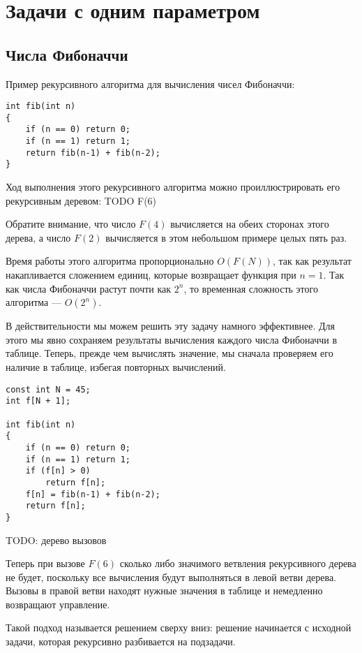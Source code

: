 \documentclass[14pt,openany]{book}
\begin{document}
\chapter{Задачи с одним параметром}

\section{Числа Фибоначчи}

Пример рекурсивного алгоритма для вычисления чисел Фибоначчи:

\begin{lstlisting}
int fib(int n)
{
    if (n == 0) return 0;
    if (n == 1) return 1;
    return fib(n-1) + fib(n-2);
}
\end{lstlisting}

Ход выполнения этого рекурсивного алгоритма можно проиллюстрировать его рекурсивным
деревом: TODO F(6)

Обратите внимание, что число $F(4)$ вычисляется на обеих сторонах этого дерева, а число
$F(2)$ вычисляется в этом небольшом примере целых пять раз.

Время работы этого алгоритма пропорционально $O(F(N))$, так как результат накапливается
сложением единиц, которые возвращает функция при $n=1$. Так как числа Фибоначчи растут почти
как $2^n$, то временная сложность этого алгоритма --- $O(2^n)$.

В действительности мы можем решить эту задачу намного эффективнее. Для этого мы явно сохраняем
результаты вычисления каждого числа Фибоначчи в таблице. Теперь, прежде чем вычислять
значение, мы сначала проверяем его наличие в таблице, избегая повторных вычислений.

\begin{lstlisting}
const int N = 45;
int f[N + 1];

int fib(int n)
{
    if (n == 0) return 0;
    if (n == 1) return 1;
    if (f[n] > 0)
        return f[n];
    f[n] = fib(n-1) + fib(n-2);
    return f[n];
}
\end{lstlisting}

TODO: дерево вызовов

Теперь при вызове $F(6)$ сколько либо значимого ветвления рекурсивного дерева не будет,
поскольку все вычисления будут выполняться в левой ветви дерева. Вызовы в правой ветви
находят нужные значения в таблице и немедленно возвращают управление.

Такой подход называется решением сверху вниз: решение начинается с исходной задачи, которая 
рекурсивно разбивается на подзадачи.
\end{document}
